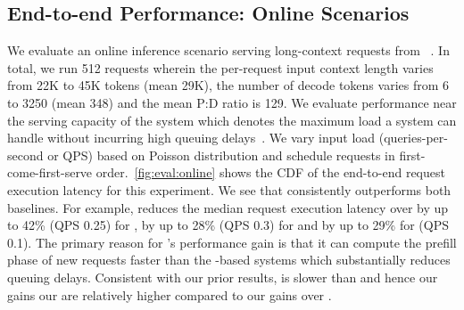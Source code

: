 \subsection{End-to-end Performance: Online Scenarios}
\label{sec:eval:online}

We evaluate an online inference scenario serving long-context requests from \arxivsummarization~\cite{arxiv}. In total, we run 512 requests wherein the per-request input context length varies from 22K to 45K tokens (mean 29K), the number of decode tokens varies from 6 to 3250 (mean 348) and the mean P:D ratio is 129. We evaluate performance near the serving capacity of the system which denotes the maximum load a system can handle without incurring high queuing delays~\cite{vllmsosp,sarathiserve2024}. We vary input load (queries-per-second or QPS) based on Poisson distribution and schedule requests in first-come-first-serve order.~\autoref{fig:eval:online} shows the CDF of the end-to-end request execution latency for this experiment. We see that \sysname consistently outperforms both baselines. For example, \favattention reduces the median request execution latency over \fapaged by up to 42\% (QPS 0.25) for \yismall, by up to 28\% (QPS 0.3) for \llamasmall and  by up to 29\% for \yimedium (QPS 0.1).  The primary reason for \sysname's performance gain is that it can compute the prefill phase of new requests faster than the \pa-based systems which substantially reduces queuing delays. Consistent with our prior results, \fipaged is slower than \fapaged and hence our gains our \fipaged are relatively higher compared to our gains over \fapaged.

